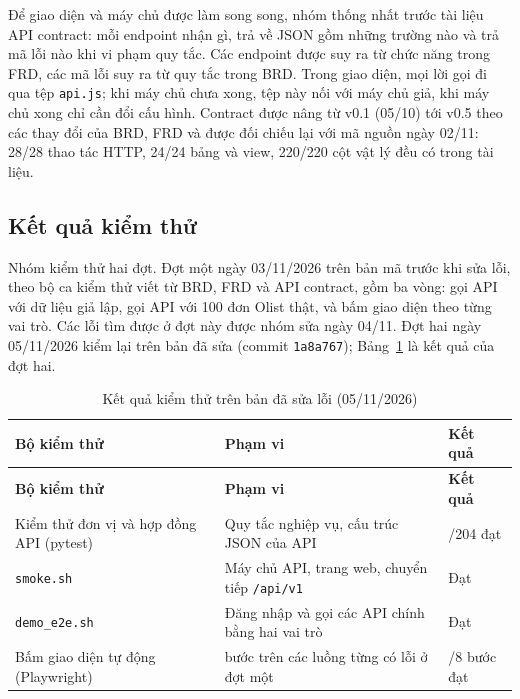 Để giao diện và máy chủ được làm song song, nhóm thống nhất trước tài liệu API contract: mỗi
endpoint nhận gì, trả về JSON gồm những trường nào và trả mã lỗi nào khi vi phạm quy tắc. Các
endpoint được suy ra từ chức năng trong FRD, các mã lỗi suy ra từ quy tắc trong BRD. Trong giao diện,
mọi lời gọi đi qua tệp \texttt{api.js}; khi máy chủ chưa xong, tệp này nối với máy chủ giả, khi máy
chủ xong chỉ cần đổi cấu hình. Contract được nâng từ v0.1 (05/10) tới v0.5 theo các thay đổi của BRD,
FRD và được đối chiếu lại với mã nguồn ngày 02/11: 28/28 thao tác HTTP, 24/24 bảng và view, 220/220
cột vật lý đều có trong tài liệu.

\subsection{Kết quả kiểm thử}

Nhóm kiểm thử hai đợt. Đợt một ngày 03/11/2026 trên bản mã trước khi sửa lỗi, theo bộ ca kiểm thử
viết từ BRD, FRD và API contract, gồm ba vòng: gọi API với dữ liệu giả lập, gọi API với 100 đơn Olist
thật, và bấm giao diện theo từng vai trò. Các lỗi tìm được ở đợt này được nhóm sửa ngày 04/11. Đợt
hai ngày 05/11/2026 kiểm lại trên bản đã sửa (commit \texttt{1a8a767}); Bảng~\ref{tab:kiem-thu} là
kết quả của đợt hai.

{\small
\renewcommand{\arraystretch}{1.25}
\begin{longtable}{|>{\raggedright\arraybackslash}p{5.4cm}|>{\raggedright\arraybackslash}p{5cm}|>{\raggedright\arraybackslash}p{4cm}|}
\caption{Kết quả kiểm thử trên bản đã sửa lỗi (05/11/2026)}\label{tab:kiem-thu}\\ \hline
\textbf{Bộ kiểm thử} & \textbf{Phạm vi} & \textbf{Kết quả} \\ \hline \endfirsthead
\hline \textbf{Bộ kiểm thử} & \textbf{Phạm vi} & \textbf{Kết quả} \\ \hline \endhead
Kiểm thử đơn vị và hợp đồng API (pytest) & Quy tắc nghiệp vụ, cấu trúc JSON của API & 204/204 đạt \\ \hline
\texttt{smoke.sh} & Máy chủ API, trang web, chuyển tiếp \texttt{/api/v1} & Đạt \\ \hline
\texttt{demo\_e2e.sh} & Đăng nhập và gọi các API chính bằng hai vai trò & Đạt \\ \hline
Bấm giao diện tự động (Playwright) & 8 bước trên các luồng từng có lỗi ở đợt một & 7/8 bước đạt \\ \hline
\end{longtable}
}

